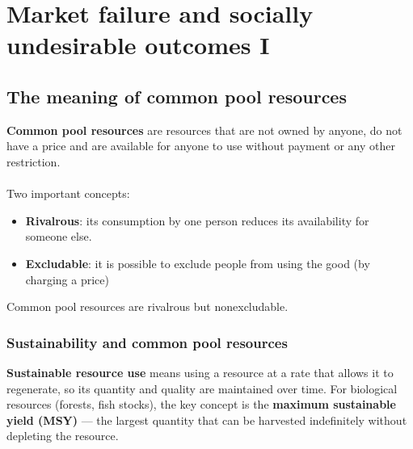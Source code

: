 \documentclass[a4paper,12pt]{article}
\newcommand{\needbold}[1]{\textcolor{red!70!black}{\textbf{#1}}}
\begin{document}
\section{Market failure and socially undesirable outcomes I}
\subsection{The meaning of common pool resources}
\needbold{Common pool resources} are resources that are not owned by anyone, do not have a price and are available for anyone to use without payment or any other restriction.\\\\
Two important concepts:
\begin{itemize}
  \item \needbold{Rivalrous}: its consumption by one person reduces its availability for someone else.
  \item \needbold{Excludable}: it is possible to exclude people from using the good (by charging a price)
\end{itemize}
Common pool resources are rivalrous but non­excludable. 
\subsubsection*{Sustainability and common pool resources}
\textbf{Sustainable resource use} means using a resource at a rate that allows it to regenerate, so its quantity and quality are maintained over time. For biological resources (forests, fish stocks), the key concept is the \textbf{maximum sustainable yield (MSY)} --- the largest quantity that can be harvested indefinitely without depleting the resource.
\end{document}
